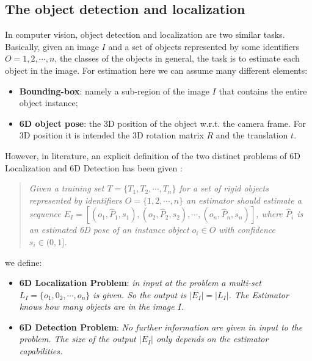 \subsection{The object detection and localization}\label{subsec:detection_and_localization}
In computer vision, object detection and localization are two similar tasks. Basically, given an image $I$ and a set of objects represented by some identifiers $O = {1, 2, \cdots, n}$, the classes of the objects in general, the task is to estimate each object in the image. For estimation here we can assume many different elements:

\begin{itemize}
	\item \textbf{Bounding-box}: namely a sub-region of the image $I$ that contains the entire object instance;
	\item \textbf{6D object pose}: the 3D position of the object w.r.t. the camera frame. For 3D position it is intended the 3D rotation matrix $R$ and the translation $t$.
\end{itemize}

However, in literature, an explicit definition of the two distinct problems of 6D Localization and 6D Detection has been given \cite{hodan20166DPoseEstimation}:

\begin{quotation}
\emph{Given a training set $T = \{T_1 , T_2 , \cdots , T_n \}$ for a set of rigid objects represented by identifiers $O = \{1, 2, \cdots , n\}$ an estimator should estimate a sequence $E_I = [(o_1, \hat{P}_1, s_1), (o_2, \hat{P}_2, s_2), \cdots , (o_n, \hat{P}_n, s_n)]$, where $\hat{P}_i$ is an estimated 6D pose of an instance object $o_i \in O$ with confidence $s_i \in (0, 1]$.}
\end{quotation}

we define:

\begin{itemize}
	\item \textbf{6D Localization Problem}: \emph{in input at the problem a multi-set $L_I = \{o_1, 0_2, \cdots, o_n\}$ is given. So the output is $|E_I| = |L_I|$. The Estimator knows how many objects are in the image $I$.}
	\item \textbf{6D Detection Problem}: \emph{No further information are given in input to the problem. The size of the output $|E_I|$ only depends on the estimator capabilities.}
\end{itemize}

